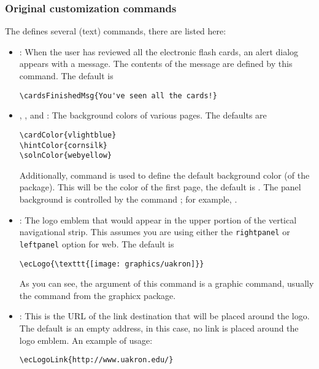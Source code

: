 \documentclass{article}
\begin{document}
\subsubsection{Original customization commands}\label{ss:origCus}

The  defines several (text) commands, there are listed here:
\begin{itemize}
\item {}: When the user has reviewed all the electronic flash cards,
    an alert dialog appears with a message. The contents of the message are defined by
    this command. The default is
\begin{Verbatim}[xleftmargin=\amtIndent]
\cardsFinishedMsg{You've seen all the cards!}
\end{Verbatim}

\item {}, , and : The background colors of various pages.
The defaults are
\begin{Verbatim}[xleftmargin=\amtIndent]
\cardColor{vlightblue}
\hintColor{cornsilk}
\solnColor{webyellow}
\end{Verbatim}
Additionally,  command is used to define the default
background color (of the  package). This will be the color of the
first page, the default is . The panel
background is controlled by the  command ; for
example, .

\item {}: The logo emblem that would appear in the upper portion of the vertical
    navigational strip. This assumes  you are using either the \texttt{rightpanel} or
    \texttt{leftpanel} option for \textsf{web}. The default is
\begin{Verbatim}[xleftmargin=\amtIndent]
\ecLogo{\texttt{[image: graphics/uakron]}}
\end{Verbatim}
As you can see, the argument of this command is a graphic command, usually the command
 from the \textsf{graphicx} package.

\item {}: This is the URL of the link destination that will be placed
    around the logo. The default is an empty address, in this case, no link is placed
    around the logo emblem. An example of usage:
\begin{Verbatim}[xleftmargin=\amtIndent]
\ecLogoLink{http://www.uakron.edu/}
\end{Verbatim}


\end{itemize}
\end{document}
